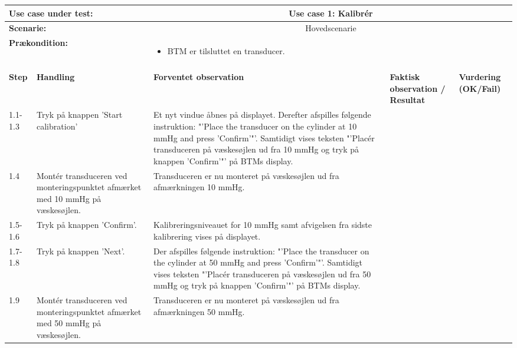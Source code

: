 \begin{tabular}{|p{1cm}|p{3cm}|p{4cm}|p{4cm}|p{2cm}|}
\hline
\multicolumn{2}{|p{3cm}|}{\textbf{Use case under test:}} & \multicolumn{3}{c|}{Use case 1: Kalibrér} \\\hline

\multicolumn{2}{|p{3cm}|}{\textbf{Scenarie:}} & \multicolumn{3}{c|}{Hovedscenarie} \\\hline

\multicolumn{2}{|p{3cm}|}{\textbf{Prækondition:}}  & \multicolumn{3}{l|}{\parbox{0.6\textwidth}{
\begin{itemize}[label=$\circ$]
\item BTM er tilsluttet en transducer. 
\end{itemize} }}\\\hline

\multicolumn{5}{|c|}{} \\\hline

\textbf{Step} & \textbf{Handling} & \textbf{Forventet observation} & \textbf{Faktisk observation / Resultat} & \textbf{Vurdering (OK/Fail)}\\\hline

1.1-1.3 & Tryk på knappen 'Start calibration' & Et nyt vindue åbnes på displayet. Derefter afspilles følgende instruktion: "'Place the transducer on the cylinder at 10 mmHg and press 'Confirm'"'. Samtidigt vises teksten "'Placér transduceren på væskesøjlen ud fra 10 mmHg og tryk på knappen 'Confirm'"' på BTMs display. & & \\\hline

1.4 & Montér transduceren ved monteringspunktet afmærket med 10 mmHg på væskesøjlen. & Transduceren er nu monteret på væskesøjlen ud fra afmærkningen 10 mmHg. & &  \\\hline

1.5-1.6 & Tryk på knappen 'Confirm'. & Kalibreringsniveauet for 10 mmHg samt afvigelsen fra sidste kalibrering vises på displayet. &  & \\\hline

1.7-1.8 & Tryk på knappen 'Next'. & Der afspilles følgende instruktion: "'Place the transducer on the cylinder at 50 mmHg and press 'Confirm'"'. Samtidigt vises teksten "'Placér transduceren på væskesøjlen ud fra 50 mmHg og tryk på knappen 'Confirm'"' på BTMs display. &  & \\\hline

1.9 & Montér transduceren ved monteringspunktet afmærket med 50 mmHg på væskesøjlen. & Transduceren er nu monteret på væskesøjlen ud fra afmærkningen 50 mmHg. &  & \\\hline
\end{tabular}


